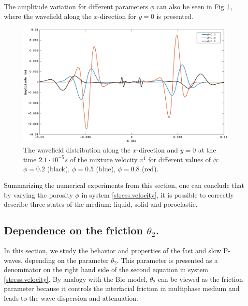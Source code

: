 \documentclass[3p,times,table]{article}
\begin{document}
 The amplitude variation  for different parameters $\phi$ can also be 
 seen in Fig.\,\ref{fig:porosity different}, where the wavefield along the 
 $x$-direction for $y=0$ is presented. 
 \begin{figure}[!htbp]
	\begin{center}
		\includegraphics[draft=false,width=1.0\textwidth]{Figures/Compare_alfa}
	\end{center}
\caption{The wavefield distribution along the $x$-direction and $y=0$  at the 
time $2.1\cdot10^{-5}s$ of the mixture velocity $v^1$ for different values of 
$\phi$: $\phi=0.2$ (black), $\phi=0.5$ (blue), $\phi=0.8$ 
(red).}
\label{fig:porosity different}
\end{figure}

Summarizing  the numerical experiments from this section, one can conclude that 
by varying the porosity $\phi$ in system \eqref{stress.velocity}, it is 
possible to correctly describe three states of the medium: liquid, solid and 
poroelastic.

\subsection{Dependence on the friction $ \theta_2 $.}

In this section, we study the behavior and properties of the fast and slow 
P-waves, depending on the parameter $\theta_2$. This parameter is presented as 
a denominator on the right hand side of the second equation in system 
\eqref{stress.velocity}. By analogy with the Bio model, $\theta_2$ can be 
viewed as the friction parameter because it controls the interfacial friction 
in multiphase medium and leads to the wave dispersion and attenuation.
\end{document}
